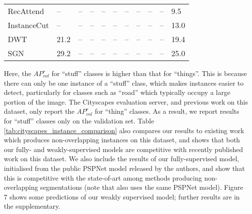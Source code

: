\documentclass[runningheads]{llncs}
\begin{document}
\begin{table}[t]
{\begin{tabularx}{1.07\linewidth}{lYYYYYYYYYY}
		RecAttend \cite{ren_cvpr_2017} & --  &   --       &   --     &   --        &    --      &   --     & --     &    --     &    --     &   9.5       \\
		InstanceCut \cite{kirillov_cvpr_2017} & --   &   --       &   --     &   --        &    --      &   --     &   --     &    --     &    --     &    13.0      \\
		DWT \cite{bai_cvpr_2017} & 21.2   &   --       &   --     &   --        &    --      &   --     &  --     &    --     &    --     &    19.4       \\
SGN \cite{liu_iccv_2017} &  29.2  &   --       &   --     &   --        &    --      &   --     &    --     &    --     &    --     &    25.0      \\
		\bottomrule
	\end{tabularx}
}
\end{table}
 Here, the $AP^{r}_{vol}$ for ``stuff'' classes is higher than that for ``things''.
This is because there can only be one instance of a ``stuff'' class, which makes instances easier to detect, particularly for classes such as ``road'' which typically occupy a large portion of the image.
The Cityscapes evaluation server, and previous work on this dataset, only report the $AP^{r}_{vol}$ for ``thing'' classes.
As a result, we report results for ``stuff'' classes only on the validation set.
Table \ref{tab:cityscapes_instance_comparison} also compares our results to existing work which produces non-overlapping instances on this dataset, and shows that both our fully- and weakly-supervised models are competitive with recently published work on this dataset.
We also include the results of our fully-supervised model, initialised from the public PSPNet model \cite{zhao_cvpr_2017} released by the authors, and show that this is competitive with the state-of-art \cite{liu_iccv_2017} among methods producing non-overlapping segmentations (note that \cite{liu_iccv_2017} also uses the same PSPNet model).
Figure 7 shows some predictions of our weakly supervised model; further results are in the supplementary.
\end{document}
